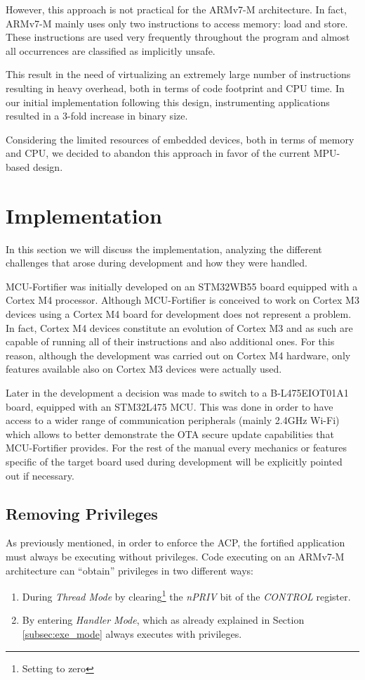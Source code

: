 \documentclass{article}
\begin{document}
However, this approach is not practical for the ARMv7-M architecture. In fact, ARMv7-M mainly uses only two instructions to access memory: load and store. These instructions are used very frequently throughout the program and almost all occurrences are classified as implicitly unsafe.

This result in the need of virtualizing an extremely large number of instructions resulting in heavy overhead, both in terms of code footprint and CPU time. In our initial implementation following this design, instrumenting applications resulted in a 3-fold increase in binary size.

Considering the limited resources of embedded devices, both in terms of memory and CPU, we decided to abandon this approach in favor of the current MPU-based design.

\newpage
\section{Implementation}
\label{sec:implementation}
In this section we will discuss the implementation, analyzing the different challenges that arose during development and how they were handled.

MCU-Fortifier was initially developed on an STM32WB55 board equipped with a Cortex M4 processor. Although MCU-Fortifier is conceived to work on Cortex M3 devices using a Cortex M4 board for development does not represent a problem. In fact, Cortex M4 devices constitute an evolution of Cortex M3 and as such are capable of running all of their instructions and also additional ones. For this reason, although the development was carried out on Cortex M4 hardware, only features available also on Cortex M3 devices were actually used.

Later in the development a decision was made to switch to a B-L475EIOT01A1 board, equipped with an STM32L475 MCU. This was done in order to have access to a wider range of communication peripherals (mainly 2.4GHz Wi-Fi) which allows to better demonstrate the OTA secure update capabilities that MCU-Fortifier provides. For the rest of the manual every mechanics or features specific of the target board used during development will be explicitly pointed out if necessary.

\subsection{Removing Privileges}
As previously mentioned, in order to enforce the ACP, the fortified application must always be executing without privileges. Code executing on an ARMv7-M architecture can ``obtain'' privileges in two different ways:
\begin{enumerate}
	\item During \textit{Thread Mode} by clearing\footnote{Setting to zero} the \textit{nPRIV} bit of the \textit{CONTROL} register.
	\item By entering \textit{Handler Mode}, which as already explained in Section \ref{subsec:exe_mode} always executes with privileges.
\end{enumerate}
\end{document}
